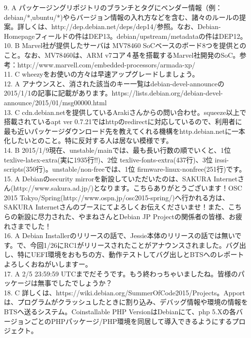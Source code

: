 \documentclass[mingoth,a4paper]{jsarticle}
\begin{document}
{9. A パッケージングリポジトリのブランチとタグにベンダー情報（例：debian/*,ubuntu/*)やらバージョン情報の入れ方などを含む、諸々のルールの提案。詳しくは、http://dep.debian.net/deps/dep14/参照。なお、Debian-Homepageフィールドの件はDEP13。debian/upstream/metadataの件はDEP12。\\
10. B Marvel社が提供したサーバは MV78460 SoCベースのボード8つを提供とのこと。なお、MV78460は、ARM v7コア４基を搭載するMarvel社開発のSoC。参考：http://www.marvell.com/embedded-processors/armada-xp/\\
11. C wheezyをお使いの方々は早速アップグレードしましょう。\\
12. A アナウンスと、消された該当のキー一覧はdebian-devel-announceの2015/1/1の記事に記載があります。https://lists.debian.org/debian-devel-announce/2015/01/msg00000.html\\
13. C cdn.debian.netを提供しているArakiさんからの問い合わせ。squeeze以上で搭載されているapt ver 0.7.21ではhttpのredirectに対応しているので、利用者に最も近いパッケージダウンロード先を教えてくれる機構をhttp.debian.netに一本化したいとのこと。特に反対する人は居ない模様です。\\
14. B 2015/1/9現在、unstable/mainでは、最も長い行数の順でいくと、1位 texlive-latex-extra(実に1935行!!)、2位 texlive-fonts-extra(437行)、3位 irssi-scripts(350行)。unstable/non-freeでは、1位 firmware-linux-nonfree(251行)です。\\
15. A Debianのsecurity mirrorを新設していただいたのは、SAKURA Internetさん(http://www.sakura.ad.jp/)となります。こちらありがとうございます！OSC 2015 Tokyo/Spring(http://www.ospn.jp/osc2015-spring/)へ行かれる方は、SAKURA Internetさんのブースにてよろしくお伝えくださいませ！また、こちらの新設に尽力された、やまねさんとDebian JP Projectの関係者の皆様、お疲れさまでした！\\
16. A Debian Installerのリリースの話で、Jessie本体のリリースの話では無いです。で、今回1/26にRC1がリリースされたことがアナウンスされました。バグ出し、特にUEFI環境をおもちの方、動作テストしてバグ出しとBTSへのレポートよろしくおねがいしますー。\\
17. A 2/5 23:59:59 UTCまでだそうです。もう終わっちゃいましたね。皆様のパッケージは無事でしたでしょうか？\\
18. C 詳しくは、https://wiki.debian.org/SummerOfCode2015/Projects。Apportは、プログラムがクラッシュしたときに割り込み、デバッグ情報や環境の情報をBTSへ送るシステム。Coinstallable PHP VersionはDebianにて、php 5.Xの各バージョンごとのPHPパッケージ/PHP環境を同居して導入できるようにするプロジェクト。\\
}
\end{document}
